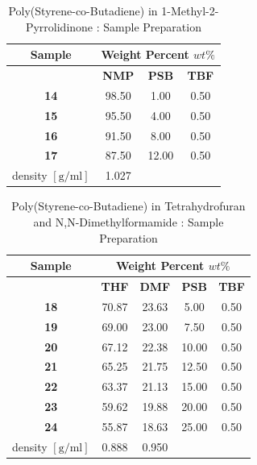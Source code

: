 \begin{table}[!th]
\centering
\caption[Poly(Styrene-co-Butadiene) in 1-Methyl-2-Pyrrolidinone : Sample Preparation]{Poly(Styrene-co-Butadiene) in 1-Methyl-2-Pyrrolidinone : Sample Preparation}
\begin{tabular}{cccc}
\hline
\textbf{Sample} & \multicolumn{3}{c}{\textbf{Weight Percent} $wt\%$} \\
\hline
{}          & \textbf{NMP} & \textbf{PSB} & \textbf{TBF} \\
\textbf{14} & 98.50        &  1.00        & 0.50         \\
\textbf{15} & 95.50        &  4.00        & 0.50         \\
\textbf{16} & 91.50        &  8.00        & 0.50         \\
\textbf{17} & 87.50        & 12.00        & 0.50         \\
\hline
density $[\textrm{g} / \textrm{ml}]$
   & 1.027        & {}           & {}           \\
\hline
\end{tabular}
\label{tab:PSBinNMP}
\end{table}

\begin{table}[!th]
\centering
\caption[Poly(Styrene-co-Butadiene) in Tetrahydrofuran and N,N-Dimethylformamide : Sample Preparation]{Poly(Styrene-co-Butadiene) in Tetrahydrofuran and N,N-Dimethylformamide : Sample Preparation}
\begin{tabular}{ccccc}
\hline
\textbf{Sample} & \multicolumn{4}{c}{\textbf{Weight Percent} $wt\%$} \\
\hline
{}          & \textbf{THF} & \textbf{DMF} & \textbf{PSB} & \textbf{TBF} \\
\textbf{18} & 70.87        & 23.63        &  5.00        & 0.50         \\
\textbf{19} & 69.00        & 23.00        &  7.50        & 0.50         \\
\textbf{20} & 67.12        & 22.38        & 10.00        & 0.50         \\
\textbf{21} & 65.25        & 21.75        & 12.50        & 0.50         \\
\textbf{22} & 63.37        & 21.13        & 15.00        & 0.50         \\
\textbf{23} & 59.62        & 19.88        & 20.00        & 0.50         \\
\textbf{24} & 55.87        & 18.63        & 25.00        & 0.50         \\
\hline
density $[\textrm{g} / \textrm{ml}]$
   & 0.888        & 0.950        & {}           & {}           \\
\hline
\end{tabular}
\label{tab:PSBinTHFnDMF}
\end{table}

